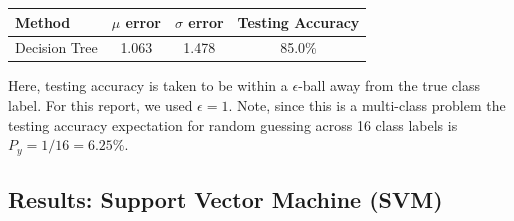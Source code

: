 \documentclass[fleqn]{article}
\begin{document}
\begin{table}[htbp]
	\centering
		\begin{tabular}{ | l | c | c | c |}
  		\hline                        
  		\textbf{Method} & \textbf{$\mu$ error} & \textbf{$\sigma$ error} & \textbf{Testing Accuracy} \\ \hline
  		Decision Tree & 1.063 & 1.478 & 85.0\% \\ \hline
		\end{tabular}
	\label{table:AccuracyDT}
\end{table}
Here, testing accuracy is taken to be within a $\epsilon$-ball away from the true class label.  For this report, we used $\epsilon = 1$.  Note, since this is a multi-class problem the testing accuracy expectation for random guessing across 16 class labels is $P_y = 1/16 = 6.25\%$.

\subsection{Results: Support Vector Machine (SVM)}
\label{sub:resultsSVM}
\end{document}
